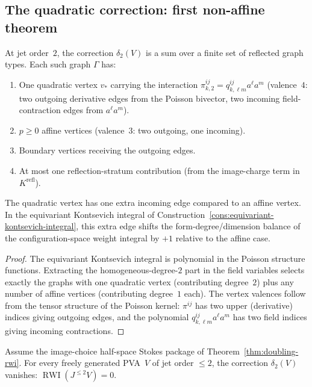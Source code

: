 \subsection{The quadratic correction: first non-affine theorem}

\begin{proposition}
\label{prop:quadratic-structure}
At jet order~$2$, the correction $\delta_2(V)$ is a sum over a finite
set of reflected graph types. Each such graph $\Gamma$ has:
\begin{enumerate}
\item One quadratic vertex $v_*$ carrying the interaction
 $\pi^{ij}_{k,2}=q^{ij}_{k,\ell m}a^\ell a^m$ (valence~$4$: two
 outgoing derivative edges from the Poisson bivector, two incoming
 field-contraction edges from $a^\ell a^m$).
\item $p\ge 0$ affine vertices (valence~$3$: two outgoing, one
 incoming).
\item Boundary vertices receiving the outgoing edges.
\item At most one reflection-stratum contribution (from the
 image-charge term in $K^{\mathrm{refl}}$).
\end{enumerate}
The quadratic vertex has one extra incoming edge compared to an affine
vertex. In the equivariant Kontsevich integral of
Construction~\ref{cons:equivariant-kontsevich-integral}, this extra
edge shifts the form-degree/dimension balance of the configuration-space
weight integral by $+1$ relative to the affine case.
\end{proposition}

\begin{proof}
The equivariant Kontsevich integral is polynomial in the Poisson
structure functions. Extracting the homogeneous-degree-$2$ part in the
field variables selects exactly the graphs with one quadratic vertex
(contributing degree~$2$) plus any number of affine vertices
(contributing degree~$1$ each). The vertex valences follow from the
tensor structure of the Poisson kernel: $\pi^{ij}$ has two upper
(derivative) indices giving outgoing edges, and the polynomial
$q^{ij}_{k,\ell m}a^\ell a^m$ has two field indices giving incoming
contractions.
\end{proof}

\begin{corollary}
\label{cor:quadratic-rwi}
Assume the image-choice half-space Stokes package of Theorem~\ref{thm:doubling-rwi}. For every freely
generated PVA~$V$ of jet order $\le 2$, the
correction $\delta_2(V)$ vanishes:
$\operatorname{RWI}(J^{\le 2}V)=0$.
\end{corollary}

